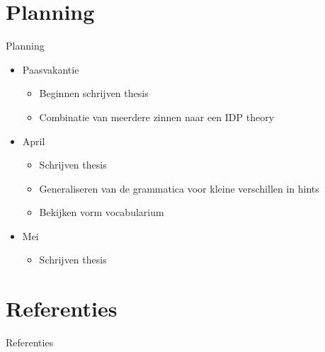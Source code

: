 \documentclass[notes, dvipsnames]{beamer}
\newcommand{\hitem}{
	\ppause
	\item
}
\newcommand{\ppause}{\onslide<+>}
\begin{document}
  \section{Planning}
  \begin{frame}{Planning}
			\begin{itemize}
        \hitem Paasvakantie
          \begin{itemize}
            \item Beginnen schrijven thesis
            \item Combinatie van meerdere zinnen naar een IDP theory
          \end{itemize}
        \hitem April
          \begin{itemize}
            \item Schrijven thesis
            \item Generaliseren van de grammatica voor kleine verschillen in hints
            \item Bekijken vorm vocabularium
          \end{itemize}
        \hitem Mei
          \begin{itemize}
            \item Schrijven thesis
          \end{itemize}
			\end{itemize}
  \end{frame}
			
	\section{Referenties}
	\begin{frame}[allowframebreaks]{Referenties}
		
		
	\end{frame}
	
\end{document}
